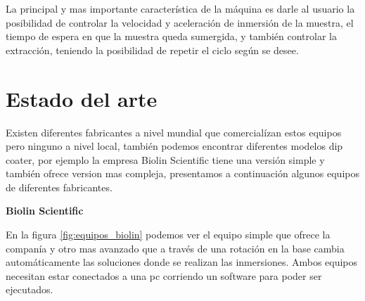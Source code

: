 La principal y mas importante característica de la máquina es darle al usuario la posibilidad de controlar la velocidad y aceleración de inmersión de la muestra, el tiempo de espera en que la muestra queda sumergida, y también controlar la extracción, teniendo la posibilidad de repetir el ciclo según se desee.
 


\section{Estado del arte}

Existen diferentes fabricantes a nivel mundial que comercialízan estos equipos pero ninguno a nivel local, también podemos encontrar diferentes modelos dip coater, por ejemplo la empresa Biolin Scientific tiene una versión simple y también ofrece version mas compleja, presentamos a continuación algunos equipos de diferentes fabricantes.

\textbf{Biolin Scientific}  \citep{1_web_biolin}

En la figura \ref{fig:equipos_biolin} podemos ver el equipo simple que ofrece la companía y otro mas avanzado que a través de una rotación en la base cambia automáticamente las soluciones donde se realizan las inmersiones. Ambos equipos necesitan estar conectados a una pc corriendo un software para poder ser ejecutados.

